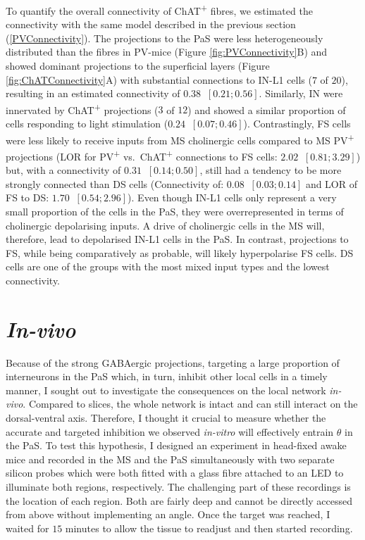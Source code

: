 \documentclass[
  12pt,
  a4paper,
  openany]{book}
\begin{document}
\noindent To quantify the overall connectivity of ChAT\textsuperscript{+} fibres, we estimated the connectivity with the same model described in the previous section (\ref{PVConnectivity}). The projections to the PaS were less heterogeneously distributed than the fibres in PV-mice (Figure \ref{fig:PVConnectivity}B) and showed dominant projections to the superficial layers (Figure \ref{fig:ChATConnectivity}A) with substantial connections to IN-L1 cells (\(7\) of \(20\)), resulting in an estimated connectivity of \(0.38\ \) \([0.21; 0.56]\). Similarly, IN were innervated by ChAT\textsuperscript{+} projections (\(3\) of \(12\)) and showed a similar proportion of cells responding to light stimulation (\(0.24\ \) \([0.07; 0.46]\)). Contrastingly, FS cells were less likely to receive inputs from MS cholinergic cells compared to MS PV\textsuperscript{+} projections (LOR for PV\textsuperscript{+} vs.~ChAT\textsuperscript{+} connections to FS cells: \(2.02\ \) \([0.81; 3.29]\)) but, with a connectivity of \(0.31\ \) \([0.14; 0.50]\), still had a tendency to be more strongly connected than DS cells (Connectivity of: \(0.08\ \) \([0.03; 0.14]\) and LOR of FS to DS: \(1.70\ \) \([0.54; 2.96]\)). Even though IN-L1 cells only represent a very small proportion of the cells in the PaS, they were overrepresented in terms of cholinergic depolarising inputs. A drive of cholinergic cells in the MS will, therefore, lead to depolarised IN-L1 cells in the PaS. In contrast, projections to FS, while being comparatively as probable, will likely hyperpolarise FS cells. DS cells are one of the groups with the most mixed input types and the lowest connectivity.

\FloatBarrier

\hypertarget{in-vivo}{%
\section{\texorpdfstring{\emph{In-vivo}}{In-vivo}}\label{in-vivo}}

Because of the strong GABAergic projections, targeting a large proportion of interneurons in the PaS which, in turn, inhibit other local cells in a timely manner, I sought out to investigate the consequences on the local network \emph{in-vivo}. Compared to slices, the whole network is intact and can still interact on the dorsal-ventral axis. Therefore, I thought it crucial to measure whether the accurate and targeted inhibition we observed \emph{in-vitro} will effectively entrain \(\theta\) in the PaS. To test this hypothesis, I designed an experiment in head-fixed awake mice and recorded in the MS and the PaS simultaneously with two separate silicon probes which were both fitted with a glass fibre attached to an LED to illuminate both regions, respectively. The challenging part of these recordings is the location of each region. Both are fairly deep and cannot be directly accessed from above without implementing an angle. Once the target was reached, I waited for \(15\) minutes to allow the tissue to readjust and then started recording.
\end{document}
